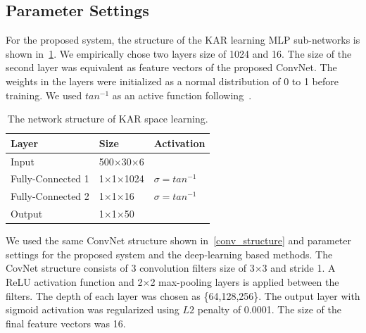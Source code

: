 \subsection{Parameter Settings}
For the proposed system, the structure of the KAR learning MLP sub-networks is shown in~\ref{kar_structure}. We empirically chose two layers size of 1024 and 16. The size of the second layer was equivalent as feature vectors of the proposed ConvNet. The weights in the layers were initialized as a normal distribution of 0 to 1 before training.
We used $tan^{-1}$ as an active function following~\cite{toh2018analytic}.
\begin{table}[]
    \caption{The network structure of KAR space learning.}
    \label{kar_structure}
    \centering
    \begin{tabular}{|l|l|l|}
    \hline
    Layer   & Size     & Activation \\ \hline
    Input   & 500$\times$30$\times$6 &            \\
    Fully-Connected 1 & 1$\times$1$\times$1024 & $\sigma = {tan}^{-1}$     \\
    Fully-Connected 2 & 1$\times$1$\times$16  & $\sigma = {tan}^{-1}$     \\
    Output  & 1$\times$1$\times$50   &            \\ \hline
    \end{tabular}
\end{table}
We used the same ConvNet structure shown in~\ref{conv_structure} and parameter settings for the proposed system and the deep-learning based methods. The CovNet structure consists of 3  convolution filters size of 3$\times$3 and stride 1. A ReLU activation function and 2$\times$2 max-pooling layers is applied between the filters. The depth of each layer was chosen as \{64,128,256\}. The output layer with sigmoid activation was regularized using $L2$ penalty of 0.0001. The size of the final feature vectors was 16.
